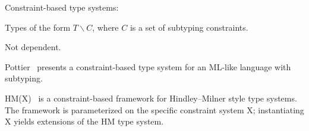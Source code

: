 \documentclass[nocopyrightspace,preprint,9pt]{sigplanconf}
\begin{document}
Constraint-based type systems:

\cite{mitchell84}

\cite{fuh88}

\cite{curtis90}

\cite{aiken93}

\cite{jones94}

\cite{smith94}

\cite{palsberg95}

\cite{trifonov96}

        Types of the form $T\backslash C$, where $C$ is
        a set of subtyping constraints.

        Not dependent.

\cite{fahndrich99}


Pottier~\cite{pottier96simplifying,pottier01b}
presents a constraint-based type system for an ML-like language with
subtyping.


HM(X)~\cite{sulzmann97type,pottier01a,pottier-remy-attapl}
is a constraint-based framework
for Hindley--Milner style type systems.
The framework is parameterized on the specific constraint system
X; instantiating X yields extensions of the HM type system.
\end{document}
